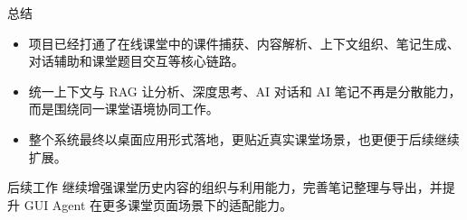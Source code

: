 \documentclass[11pt,aspectratio=169]{ctexbeamer}
\begin{document}
\begin{frame}[t]{总结}
\normalsize
\begin{itemize}
\item 项目已经打通了在线课堂中的课件捕获、内容解析、上下文组织、笔记生成、对话辅助和课堂题目交互等核心链路。
\item 统一上下文与 RAG 让分析、深度思考、AI 对话和 AI 笔记不再是分散能力，而是围绕同一课堂语境协同工作。
\item 整个系统最终以桌面应用形式落地，更贴近真实课堂场景，也更便于后续继续扩展。
\end{itemize}
\vspace{0.45em}
\begin{block}{后续工作}
继续增强课堂历史内容的组织与利用能力，完善笔记整理与导出，并提升 GUI Agent 在更多课堂页面场景下的适配能力。
\end{block}
\end{frame}
\end{document}

